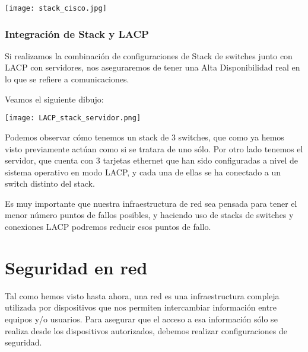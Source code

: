 \begin{center}
    \vspace{-10pt}
    \texttt{[image: stack\_cisco.jpg]}
    \vspace{-10pt}
\end{center}


\subsection{Integración de Stack y LACP}
Si realizamos la combinación de configuraciones de Stack de switches junto con LACP con servidores, nos aseguraremos de tener una Alta Disponibilidad real en lo que se refiere a comunicaciones.

Veamos el siguiente dibujo:


\begin{center}
    \vspace{-10pt}
    \texttt{[image: LACP\_stack\_servidor.png]}
    \vspace{-10pt}
\end{center}

Podemos observar cómo tenemos un stack de 3 switches, que como ya hemos visto previamente actúan como si se tratara de uno sólo. Por otro lado tenemos el servidor, que cuenta con 3 tarjetas ethernet que han sido configuradas a nivel de sistema operativo en modo LACP, y cada una de ellas se ha conectado a un switch distinto del stack.


Es muy importante que nuestra infraestructura de red sea pensada para tener el menor número puntos de fallos posibles, y haciendo uso de stacks de switches y conexiones LACP podremos reducir esos puntos de fallo.


\chapter{Seguridad en red}
Tal como hemos visto hasta ahora, una red es una infraestructura compleja utilizada por dispositivos que nos permiten intercambiar información entre equipos y/o usuarios. Para asegurar que el acceso a esa información sólo se realiza desde los dispositivos autorizados, debemos realizar configuraciones de seguridad.

